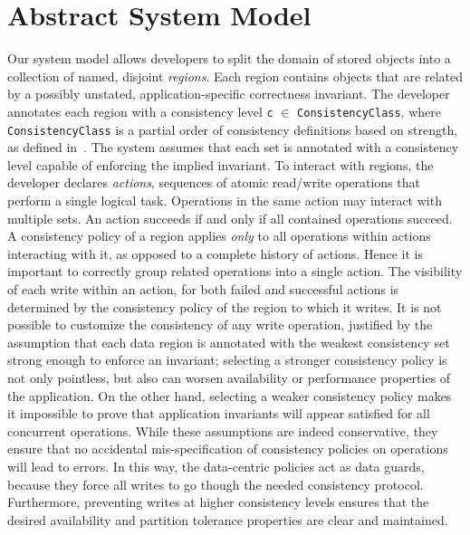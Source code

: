 \documentclass[preprint,numbers]{sigplanconf}
\begin{document}
\section{Abstract System Model}
Our system model allows developers to split the domain of stored objects into a
collection of named, disjoint
\emph{regions}. Each
region contains objects that are related by a possibly unstated,
application-specific correctness invariant. The
developer annotates each region with a consistency level \texttt{c} $\in$
\texttt{ConsistencyClass}, where \texttt{ConsistencyClass} is a partial order
of consistency definitions based on strength, as defined
in~\cite{sivaramakrishnan2015declarative}. The system assumes that each
set is annotated with a consistency level capable of
enforcing the implied invariant. To interact with regions, the developer
declares \emph{actions}, sequences of atomic
read/write operations that perform a single logical task.
Operations in the same action may interact with multiple sets. An action succeeds if and only if
all contained operations succeed. A consistency policy of a region applies
\emph{only} to all operations within actions interacting with it, as opposed to a complete
history of actions.  Hence it is important to
correctly group related operations into a single action.
The visibility
of each write within an action, for both failed and successful
actions is determined by the consistency policy of the region to which it writes.
It is not possible to customize the consistency of any write operation, justified
by the assumption that each data region is annotated with the weakest
consistency set strong enough to enforce an invariant; selecting a stronger
consistency policy is not only pointless, but also can worsen
availability or performance properties of the application. On the other hand,
selecting a weaker consistency policy makes it impossible to prove that
application invariants will appear satisfied for all concurrent operations.
While these assumptions are indeed conservative, they ensure that no accidental
mis-specification of consistency policies on operations will lead to errors. In this way, the
data-centric policies act as data guards, because they force all writes to go
though the needed consistency protocol. Furthermore, preventing writes at higher
consistency levels ensures that the desired availability and partition tolerance
properties are clear and maintained. 
\end{document}
